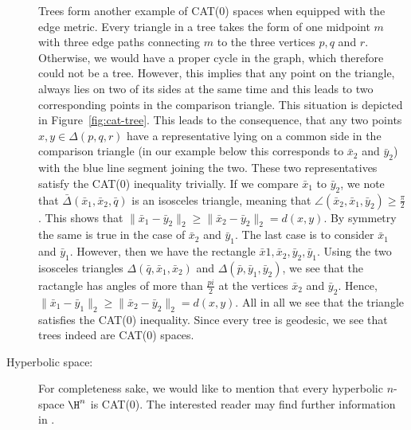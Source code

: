 \begin{bsp}
\begin{description}
    Trees form another example of CAT(0) spaces when equipped with the edge metric. Every triangle in a tree takes the form of one midpoint \(m\) with three edge paths connecting \(m\) to the three vertices \(p,q\) and \(r\). Otherwise, we would have a proper cycle in the graph, which therefore could not be a tree. However, this implies that any point on the triangle, always lies on two of its sides at the same time and this leads to two corresponding points in the comparison triangle. This situation is depicted in Figure~\ref{fig:cat-tree}. This leads to the consequence, that any two points \(x,y \in \Delta(p,q,r)\) have a representative lying on a common side in the comparison triangle (in our example below this corresponds to \(\bar x_2\) and \(\bar y_2\)) with the blue line segment joining the two. These two representatives satisfy the CAT(0) inequality trivially. If we compare \(\bar x_1\) to \(\bar y_2\), we note that \(\bar \Delta(\bar x_1, \bar x_2, \bar q)\) is an isosceles triangle, meaning that \(\angle(\bar x_2, \bar x_1, \bar y_2) \geq \frac{\pi}{2}\). This shows that \(\|\bar x_1 - \bar y_2\|_2 \geq \|\bar x_2 - \bar y_2\|_2 = d(x,y)\). By symmetry the same is true in the case of \(\bar x_2\) and \(\bar y_1\). The last case is to consider \(\bar x_1\) and \(\bar y_1\). However, then we have the rectangle \(\bar x1, \bar x_2, \bar y_2, \bar y_1\). Using the two isosceles triangles \(\Delta(\bar q, \bar x_1, \bar x_2)\) and \(\Delta(\bar p, \bar y_1, \bar y_2)\), we see that the ractangle has angles of more than \(\frac{pi}{2}\) at the vertices \(\bar x_2\) and \(\bar y_2\). Hence, \(\|\bar x_1 - \bar y_1 \|_2 \geq \|\bar x_2 - \bar y_2\|_2 = d(x,y)\). All in all we see that the triangle satisfies the CAT(0) inequality. Since every tree is geodesic, we see that trees indeed are CAT(0) spaces.
  \item[Hyperbolic space:] For completeness sake, we would like to mention that every hyperbolic \(n\)-space \(\H^n\) is CAT(0). The interested reader may find further information in \textcite[Section~II.1]{MR1744486}.
  \end{description}
\end{bsp}


